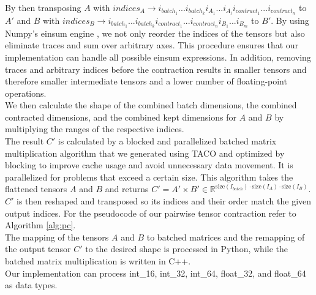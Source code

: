 By then transposing $A$
with $indices_A \rightarrow i_{{batch}_1}...i_{{batch}_k}i_{{A}_1} ...i_{{A}_l}i_{{contract}_1} ... i_{{contract}_n}$
to $A'$ and $B$ with $indices_B \rightarrow i_{{batch}_1}...i_{{batch}_k}i_{{contract}_1} ... i_{{contract}_n}i_{{B}_1} ...i_{{B}_m}$ to $B'$. By using Numpy's einsum engine \cite{Numpy}, we not only reorder the indices of the tensors but also eliminate traces and sum over arbitrary axes. This procedure ensures that our implementation can handle all possible einsum expressions. In addition, removing traces and arbitrary indices before the contraction results in smaller tensors and therefore smaller intermediate tensors and a lower number of floating-point operations.\\
 We then calculate the shape of the combined batch dimensions, the combined contracted dimensions, and the combined kept dimensions for $A$ and $B$ by multiplying the ranges of the respective indices.\\
 The result $C'$ is calculated by a blocked and parallelized batched matrix multiplication algorithm that we generated using TACO \cite{kjolstad2017taco} and optimized by blocking to improve cache usage and avoid unnecessary data movement. It is parallelized for problems that exceed a certain size. This algorithm takes the flattened tensors $A$ and $B$ and returns  $C' = A' \times B' \in \mathbb{R}^{\text{size}(I_{batch}) \cdot \text{size}(I_A) \cdot \text{size}(I_B)}$. $C'$ is then reshaped and transposed so its indices and their order match the given output indices. For the pseudocode of our pairwise tensor contraction refer to Algorithm \ref{alg:pc}.  \\
The mapping of the tensors $A$ and $B$ to batched matrices and the remapping of the output tensor $C'$ to the desired shape is processed in Python, while the batched matrix multiplication is written in C++. \\
Our implementation can process int\_16, int\_32, int\_64, float\_32, and float\_64 as data types.


